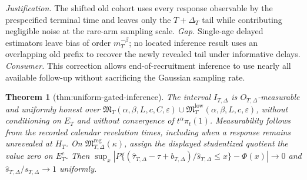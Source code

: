 \documentclass{article}
\newtheorem{theorem}{Theorem}
\begin{document}
\par\smallskip\noindent \textit{Justification.} The shifted old cohort uses every response observable by the prespecified terminal time and leaves only the \(T+\Delta_T\) tail while contributing negligible noise at the rare-arm sampling scale. \textit{Gap.} Single-age delayed estimators leave bias of order \(m_T^{-\beta}\); no located inference result uses an overlapping old prefix to recover the newly revealed tail under informative delays. \textit{Consumer.} This correction allows end-of-recruitment inference to use nearly all available follow-up without sacrificing the Gaussian sampling rate.

\begin{theorem}[thm:uniform-gated-inference]\label{thm:uniform-gated-inference}
The interval \(I_{T,\Delta}\) is \(O_{T,\Delta}\)-measurable and uniformly honest over \(\mathfrak M_T(\alpha,\beta,L,c,C,\varepsilon)\cup\mathfrak M_T^{\mathrm{low}}(\alpha,\beta,L,c,\varepsilon)\), without conditioning on \(E_T\) and without convergence of \(t^\alpha\pi_t(1)\). Measurability follows from the recorded calendar revelation times, including when a response remains unrevealed at \(H_T\). On \(\mathfrak M_{T,\Delta}^{\mathrm{reg}}(\kappa)\), assign the displayed studentized quotient the value zero on \(E_T^c\). Then \(\sup_x|P\{(\widehat\tau_{T,\Delta}-\tau+b_{T,\Delta})/\widehat s_{T,\Delta}\leq x\}-\Phi(x)|\to0\) and \(\widehat s_{T,\Delta}/s_{T,\Delta}\to1\) uniformly.
\end{theorem}
\end{document}
